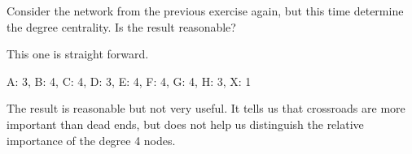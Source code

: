 
Consider the network from the previous exercise again, but this time determine the degree centrality. Is the result reasonable?

\solution
This one is straight forward. 
\begin{center}
A: 3, B: 4, C: 4, D: 3, E: 4, F: 4, G: 4, H: 3, X: 1
\end{center}
The result is reasonable but not very useful. It tells us that crossroads are more important than dead ends, but does not help us distinguish the relative importance of the degree 4 nodes. 
